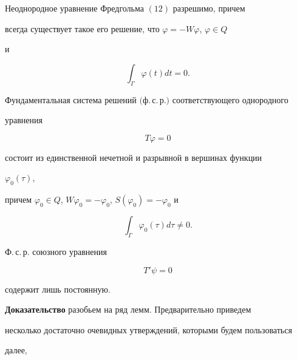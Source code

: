  


 


\begin{thm} 


Неоднородное уравнение Фредгольма $(12)$ разрешимо, причем 


всегда существует такое его решение, что $\varphi=-W\varphi$, $\varphi\in Q$ 


и 


\begin{equation} 


\int_\Gamma \varphi(t)dt=0. 


\end{equation} 


Фундаментальная система решений $($ф.\,с.\,р.$)$ соответствующего однородного 


уравнения 


\begin{equation} 


T\varphi=0 


\end{equation} 


состоит из единственной нечетной и разрывной в вершинах функции 


$\varphi_0(\tau)$, 


причем $\varphi_0\in Q$, $W\varphi_0=-\varphi_0$, $S(\varphi_0)=-\varphi_0$ и 


\begin{equation} 


\int_\Gamma \varphi_0(\tau)d\tau\ne0. 


\end{equation} 


Ф.\,с.\,р. союзного уравнения 


\begin{equation} 


T'\psi=0 


\end{equation} 


содержит лишь постоянную. 


\end{thm} 


 


 


{\bf Доказательство} разобьем на ряд лемм. Предварительно приведем 


несколько достаточно очевидных утверждений, которыми будем пользоваться 


далее,


